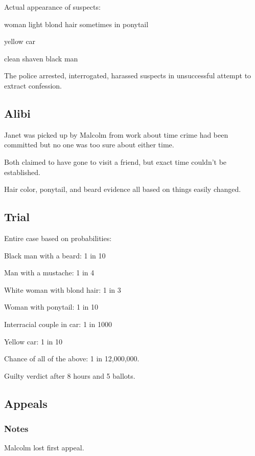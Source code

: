 \documentclass[landscape]{exam}
\begin{document}
  Actual appearance of suspects:
  \begin{itemize*}
    \item woman light blond hair sometimes in ponytail
    \item yellow car
    \item clean shaven black man
  \end{itemize*}

  The police arrested, interrogated, harassed suspects in unsuccessful attempt
  to extract confession.

  \subsection{Alibi}

  Janet was picked up by Malcolm from work about time crime had been committed
  but no one was too sure about either time.

  Both claimed to have gone to visit a friend, but exact time couldn't be
  established.

  Hair color, ponytail, and beard evidence all based on things easily changed.

  \subsection{Trial}
  Entire case based on probabilities:
  \begin{itemize*}
    \item Black man with a beard: 1 in 10
    \item Man with a mustache: 1 in 4
    \item White woman with blond hair: 1 in 3
    \item Woman with ponytail: 1 in 10
    \item Interracial couple in car: 1 in 1000
    \item Yellow car: 1 in 10
  \end{itemize*}

  Chance of all of the above: 1 in 12,000,000.

  Guilty verdict after 8 hours and 5 ballots.

  \subsection{Appeals}

  \subsubsection{Notes}
  Malcolm lost first appeal.
\end{document}
